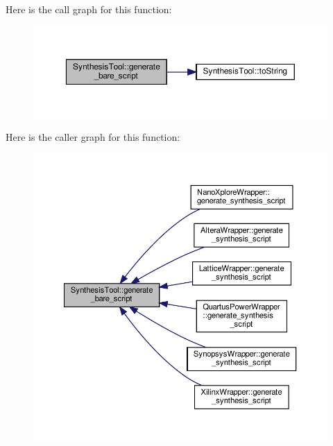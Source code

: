 Here is the call graph for this function\+:
\nopagebreak
\begin{figure}[H]
\begin{center}
\leavevmode
\includegraphics[width=350pt]{d9/de0/classSynthesisTool_aae5bc9b3dc0428681da3a31ef6566c93_cgraph}
\end{center}
\end{figure}
Here is the caller graph for this function\+:
\nopagebreak
\begin{figure}[H]
\begin{center}
\leavevmode
\includegraphics[width=350pt]{d9/de0/classSynthesisTool_aae5bc9b3dc0428681da3a31ef6566c93_icgraph}
\end{center}
\end{figure}
\mbox{\label{classSynthesisTool_ad62c7c8ec82a58b62ee6ca5325ae8e69}} 

